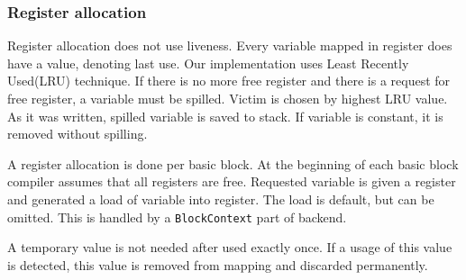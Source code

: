 \documentclass[12pt]{article}
\begin{document}
\subsubsection{Register allocation}
Register allocation does not use liveness. Every variable mapped in register does have a value, denoting last use. Our implementation uses Least Recently Used(LRU) technique. If there is no more free register and there is a request for free register, a variable must be spilled. Victim is chosen by highest LRU value. As it was written, spilled variable is saved to stack. If variable is constant, it is removed without spilling.

A register allocation is done per basic block. At the beginning of each basic block compiler assumes that all registers are free. Requested variable is given a register and generated a load of variable into register. The load is default, but can be omitted. This is handled by a \texttt{BlockContext} part of backend. 

A temporary value is not needed after used exactly once. If a usage of this value is detected, this value is removed from mapping and discarded permanently.
\end{document}
